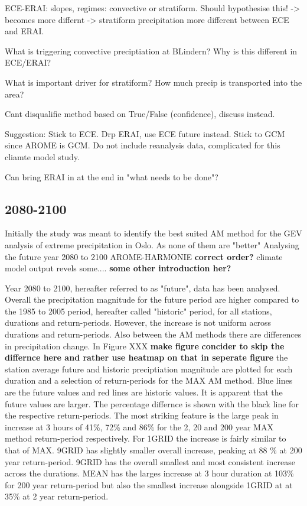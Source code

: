 ECE-ERAI: slopes, regimes: convective or stratiform. Should hypothesise this! -> becomes more differnt -> stratiform precipitation more different between ECE and ERAI. 

What is triggering convective preciptiation at BLindern? Why is this different in ECE/ERAI?

What is important driver for stratiform? How much precip is transported into the area? 

Cant disqualifie method based on True/False (confidence), discuss instead. 

Suggestion: Stick to ECE. Drp ERAI, use ECE future instead. Stick to GCM since AROME is GCM. Do not include reanalysis data, complicated for this cliamte model study.

Can bring ERAI in at the end in "what needs to be done"?

\subsection{2080-2100}

Initially the study was meant to identify the best suited AM method for the GEV analysis of extreme precipitation in Oslo. As none of them are "better"  
Analysing the future year 2080 to 2100 AROME-HARMONIE \textbf{correct order?} climate model output revels some....
\textbf{some other introduction her?}

Year 2080 to 2100, hereafter referred to as "future", data has been analysed. Overall the precipitation magnitude for the future period are higher compared to the 1985 to 2005 period, hereafter called "historic" period, for all stations, durations and return-periods. However, the increase is not uniform across durations and return-periods. Also between the AM methods there are differences in precipitation change. In Figure XXX \textbf{make figure} \textbf{concider to skip the differnce here and rather use heatmap on that in seperate figure} the station average future and historic preciptiation magnitude are plotted for each duration and a selection of return-periods for the MAX AM method. Blue lines are the future values and red lines are historic values. It is apparent that the future values are larger. The percentage differnce is shown with the black line for the respective return-periods. The most striking feature is the large peak in increase at 3 hours of 41\%, 72\% and 86$\%$ for the 2, 20 and 200 year MAX method return-period respectively. For 1GRID the increase is fairly similar to that of MAX. 9GRID has slightly smaller overall increase, peaking at 88 \% at 200 year return-period. 9GRID has the overall smallest and most consistent increase across the durations. MEAN has the larges increase at 3 hour duration at 103\% for 200 year return-period but also the smallest increase alongside 1GRID at at 35\% at 2 year return-period.       

